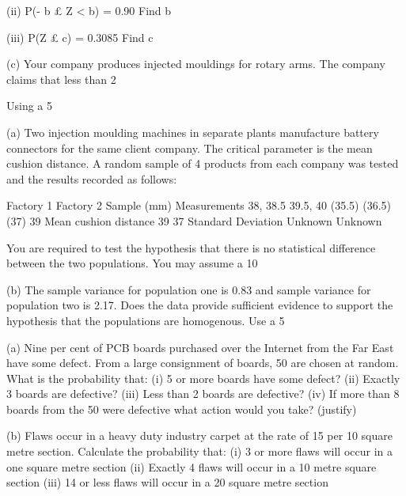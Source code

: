(ii)            P(- b £ Z < b) =  0.90		            	 Find   b

     	(iii)             P(Z £ c)  =       0.3085 			 Find   c


(c)	Your company produces injected mouldings for rotary arms. The company claims that less than 2%

Using a 5%


(a) 	Two injection moulding machines in separate plants manufacture battery
connectors for the same client company.  The critical parameter is the mean cushion distance.  A random sample of 4 products from each company was tested and the results recorded as follows:

	Factory 1	Factory 2
Sample (mm) Measurements	38,     38.5
39.5,  40	(35.5)  (36.5)
(37)     39
Mean cushion distance	39	37
Standard Deviation	Unknown	Unknown

You are required to test the hypothesis that there is no statistical difference between the two populations.  You may assume a 10%

(b) 	The sample variance for population one is 0.83 and sample variance for population two is 2.17.  Does the data provide sufficient evidence to support the hypothesis that the populations are homogenous.  Use a 5%



(a)  	Nine per cent of PCB boards purchased over the Internet from the Far East have some defect.  From a large consignment of boards, 50 are chosen at random.  What is the probability that:
(i)	5 or more boards have some defect?
(ii)	Exactly 3 boards are defective?
(iii)	Less than 2 boards are defective?
(iv)	If more than 8 boards from the 50 were defective what action would you take? (justify)


(b) 	Flaws occur in a heavy duty industry carpet at the rate of 15 per 10 square metre section.  Calculate the probability that:
(i)	3 or more flaws will occur in a one square metre section
(ii)	Exactly 4 flaws will occur in a 10 metre square section
(iii)	14 or less flaws will occur in a 20 square metre section

